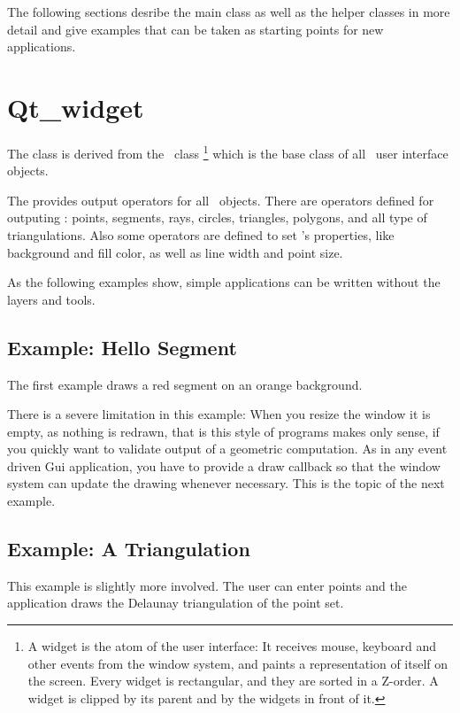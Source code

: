 The following sections desribe the main class as well as the helper classes
in more detail and give examples that can be taken as starting points for
new applications.


\section{Qt\_widget}
\label{Qt_widget}

The class  is derived from the \qt\ class %
\footnote{A widget is the atom of the user interface: It receives mouse, keyboard and other 
events from the window system, and paints a representation of itself on the 
screen. Every widget is rectangular, and they are sorted in a Z-order. A 
widget is clipped by its parent and by the widgets in front of it.} 
which is the base class of all \qt\ user interface objects. 


The  provides output operators for all \cgal\ objects. There are 
operators defined for outputing : points, segments, rays, circles, triangles, 
polygons, and all type of triangulations. Also some operators are defined to 
set 's properties, like background and fill color, as well as line
width and point size.

As the following examples show, simple applications can be written
without the layers and tools.

\subsection{Example: Hello Segment}
The first example draws a red segment on an orange background.

There is a severe limitation in this example: When you resize the window it is empty, as nothing is
redrawn, that is this style of programs makes only sense, if you quickly want to validate output
of a geometric computation. As in any event driven {\sc Gui} application, you have to provide 
a draw callback so that the window system can update the drawing whenever necessary. This is the topic
of the next example.

\subsection{Example: A Triangulation}

This example is slightly more involved. The user can enter points and the application
draws the Delaunay triangulation of the point set. 

